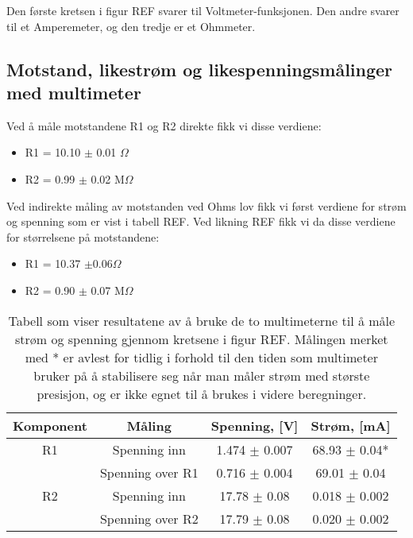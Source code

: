 \documentclass[reprint, english,notitlepage]{revtex4-1}  %
\begin{document}
Den første kretsen i figur REF svarer til Voltmeter-funksjonen. Den andre svarer til et Amperemeter, og den tredje er et Ohmmeter.


\subsection{Motstand, likestrøm og likespenningsmålinger med multimeter}
Ved å måle motstandene R1 og R2 direkte fikk vi disse verdiene:
\begin{itemize}
  \item R1 = 10.10 $\pm$ 0.01 $\Omega$
  \item R2 = 0.99 $\pm$ 0.02 M$\Omega$
\end{itemize}

Ved indirekte måling av motstanden ved Ohms lov fikk vi først verdiene for strøm og spenning som er vist i tabell REF. Ved likning REF fikk vi da disse verdiene for størrelsene på motstandene:
\begin{itemize}
  \item R1 = 10.37 $\pm 0.06 \Omega$
  \item R2 = 0.90 $\pm$ 0.07 M$\Omega$
\end{itemize}

\begin{table}[p]
\label{fig:tabell_motstander}
\caption{Tabell som viser resultatene av å bruke de to multimeterne til å måle strøm og spenning gjennom kretsene i figur REF. Målingen merket med * er avlest for tidlig i forhold til den tiden som multimeter bruker på å stabilisere seg når man måler strøm med største presisjon, og er ikke egnet til å brukes i videre beregninger.}

\begin{adjustbox}{width=\linewidth}
\begin{tabular}{||c || c | c | c||}
\hline
Komponent & Måling & Spenning, [V] & Strøm, [mA]   \\ \hline\hline
R1 & Spenning inn     & 1.474 $\pm$ 0.007 & 68.93 $\pm$ 0.04*   \\ \hline
   & Spenning over R1 & 0.716 $\pm$ 0.004 & 69.01 $\pm$ 0.04    \\ \hline
R2 & Spenning inn     & 17.78 $\pm$ 0.08  & 0.018 $\pm$ 0.002   \\ \hline
   & Spenning over R2 & 17.79 $\pm$ 0.08  & 0.020 $\pm$ 0.002   \\ \hline
\end{tabular}
\end{adjustbox}
\end{table}
\end{document}
